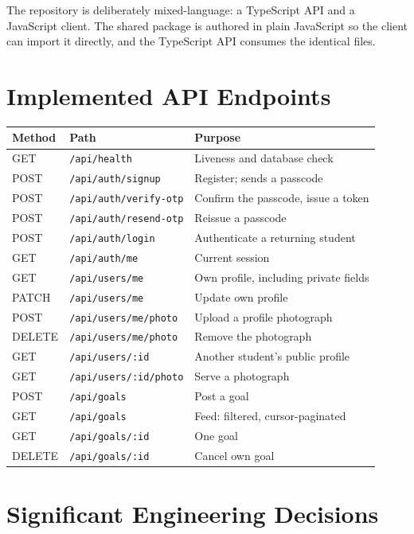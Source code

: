 \documentclass[twoside,12pt]{tietreport}
\begin{document}
The repository is deliberately mixed-language: a TypeScript API and a JavaScript
client. The shared package is authored in plain JavaScript so the client can
import it directly, and the TypeScript API consumes the identical files.

\section{Implemented API Endpoints}

\begin{longtable}{@{}p{1.6cm}p{5.4cm}p{6.0cm}@{}}
\toprule
\textbf{Method} & \textbf{Path} & \textbf{Purpose} \\
\midrule
\endhead
GET    & \texttt{/api/health}           & Liveness and database check \\
POST   & \texttt{/api/auth/signup}      & Register; sends a passcode \\
POST   & \texttt{/api/auth/verify-otp}  & Confirm the passcode, issue a token \\
POST   & \texttt{/api/auth/resend-otp}  & Reissue a passcode \\
POST   & \texttt{/api/auth/login}       & Authenticate a returning student \\
GET    & \texttt{/api/auth/me}          & Current session \\
GET    & \texttt{/api/users/me}         & Own profile, including private fields \\
PATCH  & \texttt{/api/users/me}         & Update own profile \\
POST   & \texttt{/api/users/me/photo}   & Upload a profile photograph \\
DELETE & \texttt{/api/users/me/photo}   & Remove the photograph \\
GET    & \texttt{/api/users/:id}        & Another student's public profile \\
GET    & \texttt{/api/users/:id/photo}  & Serve a photograph \\
POST   & \texttt{/api/goals}            & Post a goal \\
GET    & \texttt{/api/goals}            & Feed: filtered, cursor-paginated \\
GET    & \texttt{/api/goals/:id}        & One goal \\
DELETE & \texttt{/api/goals/:id}        & Cancel own goal \\
\bottomrule
\end{longtable}

\section{Significant Engineering Decisions}
\label{sec:decisions}
\end{document}
